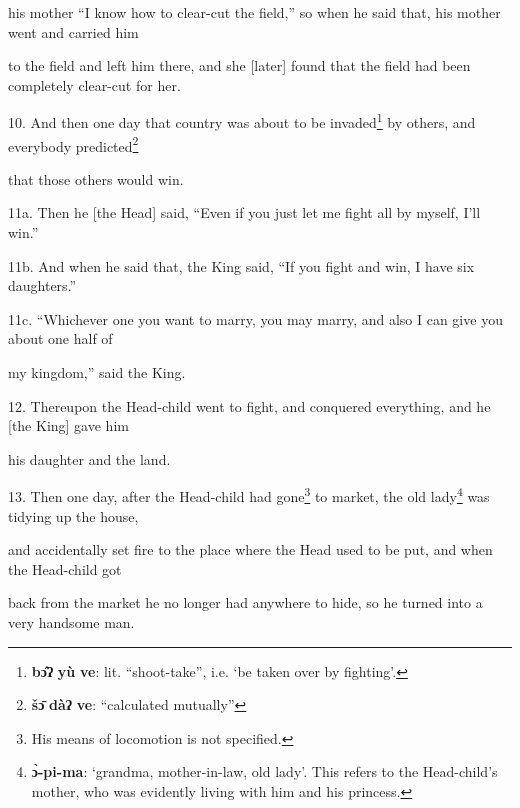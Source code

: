 his mother ``I know how to clear-cut the field,'' so when he said that, his mother
went and carried him

to the field and left him there, and she [later] found that the field had been
completely clear-cut for her.

10. And then one day that country was about to be invaded\footnote{\textbf{bɔ̂ʔ} \textbf{yù} \textbf{ve}: lit. ``shoot-take'', i.e. `be taken over by fighting'.} by others, and everybody
predicted\footnote{\textbf{šɔ̄} \textbf{dàʔ} \textbf{ve}: ``calculated mutually''}

that those others would win.

11a. Then he [the Head] said, ``Even if you just let me fight all by myself, I'll
win.''

11b. And when he said that, the King said, ``If you fight and win, I have six daughters.''

11c. ``Whichever one you want to marry, you may marry, and also I can give you
about one half of

my kingdom,'' said the King.

12. Thereupon the Head-child went to fight, and conquered everything, and he [the
King] gave him

his daughter and the land.

13. Then one day, after the Head-child had gone\footnote{His means of locomotion is not specified.} to market, the old lady\footnote{\textbf{ɔ̀-pi-ma}: `grandma, mother-in-law, old lady'. This refers to the Head-child's mother, who was evidently living with him and his princess.}
was tidying up the house,

and accidentally set fire to the place where the Head used to be put, and when
the Head-child got

back from the market he no longer had anywhere to hide, so he turned into a very
handsome man.

